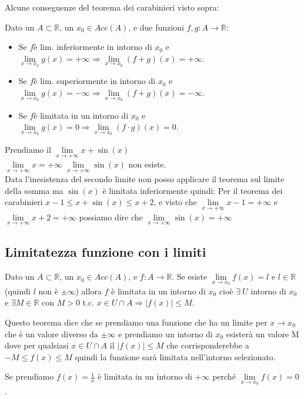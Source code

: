 Alcune conseguenze del teorema dei carabinieri visto sopra:
\begin{proposition}
Dato un $A \subset \mathbb{R}$, un $x_0 \in Acc(A)$, e due funzioni $f,g: A \to \mathbb{R}$:
\begin{itemize}
    \item Se $f$è lim. inferiormente in intorno di $x_0$ e $\lim\limits_{x\to x_0}g(x) = +\infty \Longrightarrow \lim\limits_{x\to x_0}(f + g)(x) = +\infty$.
    \item Se $f$è lim. superiormente in intorno di $x_0$ e $\lim\limits_{x\to x_0}g(x) = -\infty \Longrightarrow \lim\limits_{x\to x_0}(f + g)(x) = -\infty$.
    \item Se $f$è limitata in un intorno di $x_0$ e $\lim\limits_{x\to x_0}g(x) = 0 \Longrightarrow \lim\limits_{x\to x_0}(f \cdot g)(x) = 0$.
\end{itemize}
\end{proposition}

\begin{example}
Prendiamo il $\lim\limits_{x\to +\infty}x + \sin(x)$\\
$\lim\limits_{x\to +\infty}x = +\infty$ \hspace{.5cm} $\lim\limits_{x\to +\infty}\sin(x)$ non esiste.\\
Data l'inesistenza del secondo limite non posso applicare il teorema sul limite della somma ma $\sin(x)$ è limitata inferiormente quindi:
Per il teorema dei carabinieri $x - 1 \leq x + \sin(x) \leq x + 2$, e visto che $\lim\limits_{x\to +\infty}x - 1 = +\infty$ e $\lim\limits_{x\to +\infty}x + 2 = +\infty$ possiamo dire che $\lim\limits_{x\to +\infty}\sin(x) = +\infty$
\end{example}

\subsection{Limitatezza funzione con i limiti}
\begin{theorem}
    Dato un $A \subset \mathbb{R}$, un $x_0 \in Acc(A)$, e $f: A \to \mathbb{R}$. Se esiste $\lim\limits_{x\to x_0}f(x) = l$ e $l \in \mathbb{R}$ (quindi $l$ non è $\pm\infty$) allora $f$ è limitata in un intorno di $x_0$ cioè $\exists \: U$ intorno di $x_0$ e $\exists M \in \mathbb{R}$ con $M > 0$ t.c. $x \in U \cap A \Longrightarrow |f(x)| \leq M$.
\end{theorem}
Questo teorema dice che se prendiamo una funzione che ha un limite per $x\to x_0$ che è un valore diverso da $\pm\infty$ e prendiamo un intorno di $x_0$ esisterà un valore M dove per qualsiasi $x \in U \cap A$ il $|f(x)| \leq M$ che corrisponderebbe a $-M \leq f(x) \leq M$ quindi la funzione sarà limitata nell'intorno selezionato.
\begin{example}
Se prendiamo $f(x) = \frac{1}{x}$ è limitata in un intorno di $+\infty$ perché $\lim\limits_{x\to x_0}f(x) = 0$.
\end{example}

